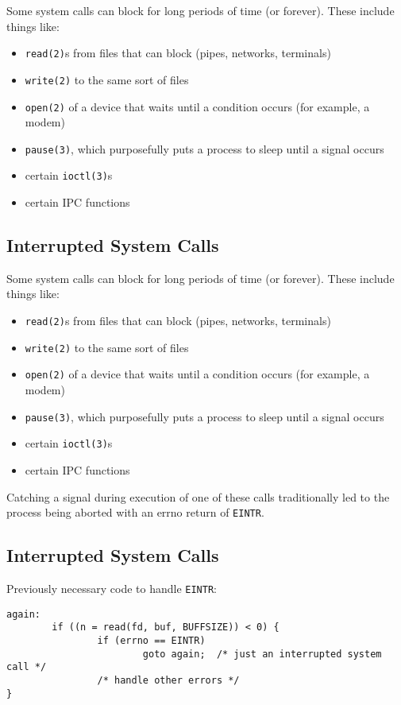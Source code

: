 \documentclass[xga]{xdvislides}
\begin{document}
Some system calls can block for long periods of time (or forever). These
include things like:

\begin{itemize}
	\item {\tt read(2)}s from files that can block (pipes, networks, terminals)
	\item {\tt write(2)} to the same sort of files
	\item {\tt open(2)} of a device that waits until a condition occurs (for example, a modem)
	\item {\tt pause(3)}, which purposefully puts a process to sleep until a signal occurs
	\item certain {\tt ioctl(3)}s
	\item certain IPC functions
\end{itemize}


\subsection{Interrupted System Calls}

Some system calls can block for long periods of time (or forever). These
include things like:

\begin{itemize}
	\item {\tt read(2)}s from files that can block (pipes, networks, terminals)
	\item {\tt write(2)} to the same sort of files
	\item {\tt open(2)} of a device that waits until a condition occurs (for example, a modem)
	\item {\tt pause(3)}, which purposefully puts a process to sleep until a signal occurs
	\item certain {\tt ioctl(3)}s
	\item certain IPC functions
\end{itemize}

Catching a signal during execution of one of these calls traditionally led
to the process being aborted with an errno return of {\tt EINTR}.


\subsection{Interrupted System Calls}
Previously necessary code to handle {\tt EINTR}:
\begin{verbatim}
again:
        if ((n = read(fd, buf, BUFFSIZE)) < 0) {
                if (errno == EINTR)
                        goto again;  /* just an interrupted system call */
                /* handle other errors */
}
\end{verbatim}
\end{document}

